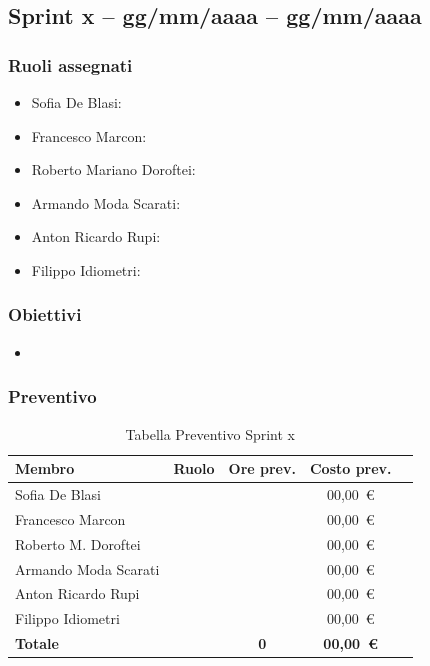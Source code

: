 \subsection{Sprint x -- gg/mm/aaaa -- gg/mm/aaaa}
\label{sec:sprintx}

\subsubsection{Ruoli assegnati}
\begin{itemize}
    \item Sofia De Blasi:  
    \item Francesco Marcon:  
    \item Roberto Mariano Doroftei:  
    \item Armando Moda Scarati:   
    \item Anton Ricardo Rupi:  
    \item Filippo Idiometri:  
\end{itemize}

\subsubsection{Obiettivi}
\begin{itemize}
    \item 
\end{itemize}

\subsubsection{Preventivo}
\begin{table}[H]
    \centering
    \renewcommand{\arraystretch}{1.3}
    \begin{tabularx}{\textwidth}{|X|c|c|c|r|}
        \hline
        \textbf{Membro} & \textbf{Ruolo} & \textbf{Ore prev.} & \textbf{Costo prev.} \\
        \hline
        Sofia De Blasi           &  &   & 00{,}00~\euro \\
        Francesco Marcon         &  &   & 00{,}00~\euro \\
        Roberto M. Doroftei      &  &   & 00{,}00~\euro \\
        Armando Moda Scarati     &  &   & 00{,}00~\euro \\
        Anton Ricardo Rupi       &  &   & 00{,}00~\euro \\
        Filippo Idiometri        &  &   & 00{,}00~\euro \\
        \hline
        \textbf{Totale}          &    & \textbf{0} &
        \textbf{00{,}00~\euro} \\
        \hline
    \end{tabularx}
    \caption{Tabella Preventivo Sprint x} 
\end{table}

